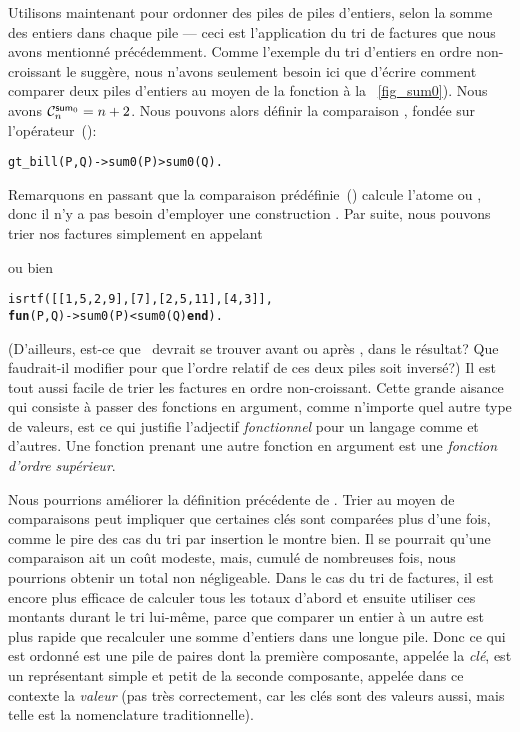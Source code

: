 Utilisons maintenant  pour ordonner des piles de
piles d'entiers, selon la somme des entiers dans chaque pile --- ceci
est l'application du tri de factures que nous avons mentionné
précédemment. Comme l'exemple du tri d'entiers en ordre non-croissant
le suggère, nous n'avons seulement besoin ici que d'écrire comment
comparer deux piles d'entiers au moyen de la fonction 
à la \fig~\vref{fig_sum0}). Nous avons \(\C{\fun{sum}_0}{n} = n +
2\). Nous pouvons alors définir la comparaison ,
fondée sur l'opérateur~(\erlcode{>}):
\begin{alltt}
gt_bill(P,Q) -> sum0(P) > sum0(Q).
\end{alltt}
Remarquons en passant que la comparaison prédéfinie~(\erlcode{>})
calcule l'atome  ou , donc il n'y a pas
besoin d'employer une construction . Par suite, nous
pouvons trier nos factures simplement en appelant
\begin{center}
\end{center}
ou bien
\begin{alltt}
      isrtf([[1,5,2,9],[7],[2,5,11],[4,3]],
            \textbf{fun}(P,Q) -> sum0(P) < sum0(Q) \textbf{end}).
\end{alltt}
(D'ailleurs, est-ce que~\erlcode{[7]} devrait se trouver avant ou
après \erlcode{[4,3]}, dans le résultat? Que faudrait-il modifier pour
que l'ordre relatif de ces deux piles soit inversé?) Il est tout aussi
facile de trier les factures en ordre non-croissant. Cette grande
aisance qui consiste à passer des fonctions en argument, comme
n'importe quel autre type de valeurs, est ce qui justifie l'adjectif
\emph{fonctionnel} pour un langage comme \Erlang et d'autres. Une
fonction prenant une autre fonction en argument est une \emph{fonction
  d'ordre supérieur}.

\label{sorted_association_lists} 

Nous pourrions améliorer la définition précédente de
. Trier au moyen de comparaisons peut impliquer que
certaines clés sont comparées plus d'une fois, comme le pire des cas
du tri par insertion le montre bien. Il se pourrait qu'une comparaison
ait un coût modeste, mais, cumulé de nombreuses fois, nous pourrions
obtenir un total non négligeable. Dans le cas du tri de factures, il
est encore plus efficace de calculer tous les totaux d'abord et
ensuite utiliser ces montants durant le tri lui-même, parce que
comparer un entier à un autre est plus rapide que recalculer une somme
d'entiers dans une longue pile. Donc ce qui est ordonné est une pile
de paires dont la première composante, appelée la \emph{clé}, est un
représentant simple et petit de la seconde composante, appelée dans ce
contexte la \emph{valeur} (pas très correctement, car les clés sont
des valeurs \Erlang aussi, mais telle est la nomenclature
traditionnelle). 

